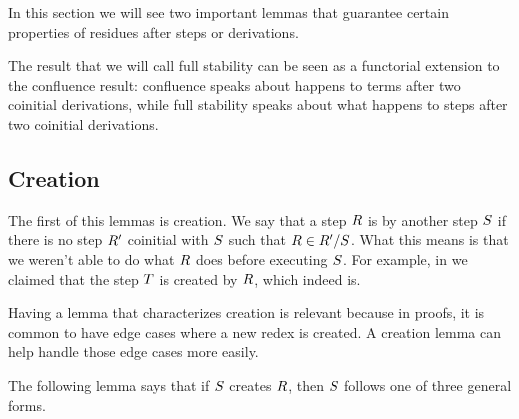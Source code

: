 

In this section we will see two important lemmas that guarantee certain properties
of residues after steps or derivations.

The result that we will call full stability can be seen as a functorial extension
to the confluence result: confluence speaks about happens to terms after
two coinitial derivations,
while full stability speaks about what happens to steps after two coinitial derivations.

\subsection*{Creation}

The first of this lemmas is creation.
We say that a step $R$ is  by another step $S$ if
there is no step $R'$ coinitial with $S$ such that $R \in R' / S$.
What this means is that we weren't able to do what $R$ does before executing $S$.
For example, in  we claimed
that the step $T$ is created by $R$, which indeed is.

Having a lemma that characterizes creation is relevant because in proofs,
it is common to have edge cases where a new redex is created.
A creation lemma can help handle those edge cases more easily.

The following lemma says that if $S$ creates $R$, then $S$ follows
one of three general forms.


